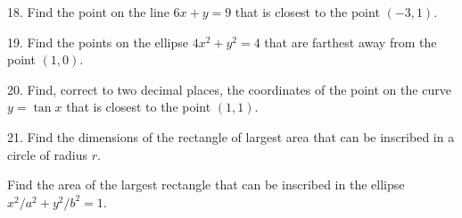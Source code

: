 \documentclass{sebase}
\begin{document}
\begin{multicols}{2}
\begin{ExerciseList}
%

\item[\hfill 18.] Find the point on the line $6x+y=9$ that is closest to the
point $(-3,1)$.

%

\item[\hfill 19.] Find the points on the ellipse $4x^{2}+y^{2}=4$ that are
farthest away from the point $(1,0)$.

%

%

\item[\hfill 20.] 
\GCALCX%
Find, correct to two decimal places, the coordinates of the point on the
curve $y=\tan x$ that is closest to the point $(1,1)$.

%

\item[\hfill 21.] Find the dimensions of the rectangle of largest area that
can be inscribed in a circle of radius $r$.

%

%

\item[{\hfill {\protect\fbox{\hspace{-2pt}22.\hspace{-2pt}}}}] Find the area
of the largest rectangle that can be inscribed in the ellipse $%
x^{2}/a^{2}+y^{2}/b^{2}=1$.


\end{ExerciseList}
\end{multicols}
\end{document}
